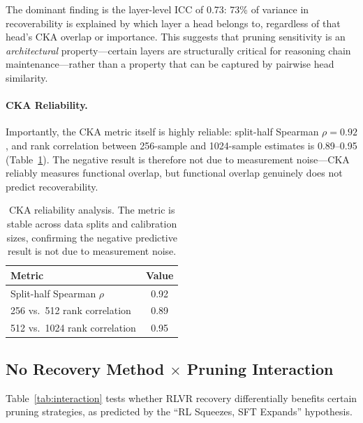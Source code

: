 \documentclass[11pt,a4paper]{article}
\begin{document}
The dominant finding is the layer-level ICC of 0.73: 73\% of variance in recoverability is explained by which layer a head belongs to, regardless of that head's CKA overlap or importance.
This suggests that pruning sensitivity is an \emph{architectural} property---certain layers are structurally critical for reasoning chain maintenance---rather than a property that can be captured by pairwise head similarity.

\paragraph{CKA Reliability.}
Importantly, the CKA metric itself is highly reliable: split-half Spearman $\rho = 0.92$, and rank correlation between 256-sample and 1024-sample estimates is 0.89--0.95 (Table~\ref{tab:cka_reliability}).
The negative result is therefore not due to measurement noise---CKA reliably measures functional overlap, but functional overlap genuinely does not predict recoverability.

\begin{table}[t]
\centering
\small
\begin{tabular}{lc}
\toprule
\textbf{Metric} & \textbf{Value} \\
\midrule
Split-half Spearman $\rho$ & 0.92 \\
256 vs.\ 512 rank correlation & 0.89 \\
512 vs.\ 1024 rank correlation & 0.95 \\
\bottomrule
\end{tabular}
\caption{CKA reliability analysis. The metric is stable across data splits and calibration sizes, confirming the negative predictive result is not due to measurement noise.}
\label{tab:cka_reliability}
\end{table}

\subsection{No Recovery Method $\times$ Pruning Interaction}
\label{sec:interaction}

Table~\ref{tab:interaction} tests whether RLVR recovery differentially benefits certain pruning strategies, as predicted by the ``RL Squeezes, SFT Expands'' hypothesis.
\end{document}
